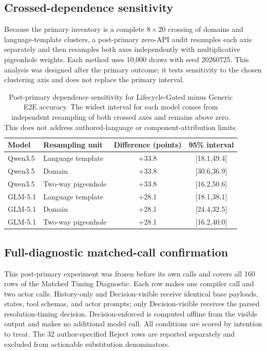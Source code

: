 \documentclass[10pt]{article}
\begin{document}
\subsection{Crossed-dependence sensitivity}
Because the primary inventory is a complete $8\times20$ crossing of domains and language-template
clusters, a post-primary zero-API audit resamples each axis separately and then resamples both axes
independently with multiplicative pigeonhole weights. Each method uses 10,000 draws with seed
20260725. This analysis was designed after the primary outcome; it tests sensitivity to the chosen
clustering axis and does not replace the primary interval.

\begin{table}[h]
\centering
\small
\begin{tabular}{llcc}
\toprule
Model & Resampling unit & Difference (points) & 95\% interval \\
\midrule
Qwen3.5 & Language template & +33.8 & [18.1,49.4] \\
Qwen3.5 & Domain & +33.8 & [30.6,36.9] \\
Qwen3.5 & Two-way pigeonhole & +33.8 & [16.2,50.6] \\
GLM-5.1 & Language template & +28.1 & [18.1,38.1] \\
GLM-5.1 & Domain & +28.1 & [24.4,32.5] \\
GLM-5.1 & Two-way pigeonhole & +28.1 & [16.2,40.0] \\
\bottomrule
\end{tabular}
\caption{Post-primary dependence sensitivity for Lifecycle-Gated minus Generic E2E accuracy.
The widest interval for each model comes from independent resampling of both crossed axes and
remains above zero. This does not address authored-language or component-attribution limits.}
\label{tab:supp-crossed-bootstrap}
\end{table}

\FloatBarrier

\subsection{Full-diagnostic matched-call confirmation}
This post-primary experiment was frozen before its own calls and covers all 160 rows of the
Matched Timing Diagnostic. Each row makes one compiler call and two actor calls. History-only and
Decision-visible receive identical base payloads, states, tool schemas, and actor prompts; only
Decision-visible receives the parsed resolution-timing decision. Decision-enforced is computed
offline from the visible output and makes no additional model call. All conditions are scored by
intention to treat. The 32 author-specified Reject rows are reported separately and excluded from
actionable substitution denominators.
\end{document}
